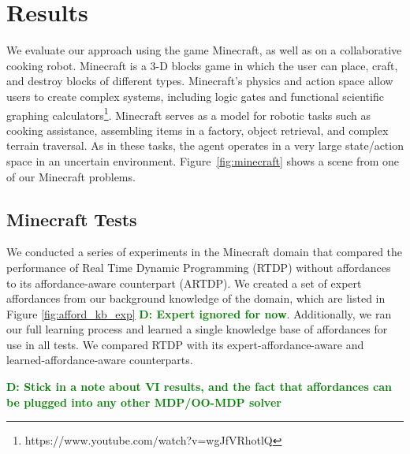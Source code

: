 \documentclass[conference]{IEEEtran}
\newcommand{\dnote}[1]{\textcolor{Green}{\textbf{D: #1}}}
\begin{document}
\section{Results}
\label{sec:results}

We evaluate our approach using the game Minecraft, as well as on a
collaborative cooking robot.  Minecraft is a 3-D blocks game in which
the user can place, craft, and destroy blocks of different types.
Minecraft's physics and action space allow users to create complex
systems, including logic gates and functional scientific graphing
calculators\footnote{https://www.youtube.com/watch?v=wgJfVRhotlQ}.
Minecraft serves as a model for robotic tasks such as cooking
assistance, assembling items in a factory, object retrieval, and
complex terrain traversal.  As in these tasks, the agent operates in a
very large state/action space in an uncertain environment.
Figure~\ref{fig:minecraft} shows a scene from one of our Minecraft
problems.

\subsection{Minecraft Tests}
We conducted a series of experiments in the Minecraft domain that
compared the performance of Real Time Dynamic Programming (RTDP)
without affordances to its affordance-aware counterpart (ARTDP). We created a set of expert
affordances from our background knowledge of the domain, which are
listed in Figure \ref{fig:afford_kb_exp} \dnote{Expert ignored for now}. Additionally, we ran our full
learning process and learned a single knowledge base of affordances for use in all tests. We compared
RTDP with its expert-affordance-aware and learned-affordance-aware 
counterparts. 

\dnote{Stick in a note about VI results, and the fact that affordances can be plugged into
any other MDP/OO-MDP solver}
\end{document}
